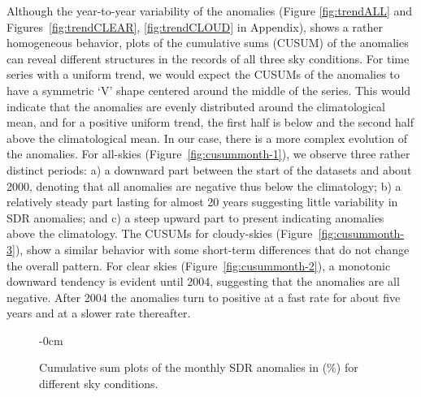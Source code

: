 \documentclass[applsci,article,submit,moreauthors,pdftex]{Definitions/mdpi}
\begin{document}
Although the year-to-year variability of the anomalies (Figure
\ref{fig:trendALL} and Figures~\ref{fig:trendCLEAR},
\ref{fig:trendCLOUD} in Appendix), shows a rather homogeneous behavior,
plots of the cumulative sums (CUSUM) \citep{Regier2019} of the anomalies
can reveal different structures in the records of all three sky
conditions. For time series with a uniform trend, we would expect the
CUSUMs of the anomalies to have a symmetric `V' shape centered around
the middle of the series. This would indicate that the anomalies are
evenly distributed around the climatological mean, and for a positive
uniform trend, the first half is below and the second half above the
climatological mean. In our case, there is a more complex evolution of
the anomalies. For all-skies (Figure~\ref{fig:cusummonth-1}), we observe
three rather distinct periods: a) a downward part between the start of
the datasets and about 2000, denoting that all anomalies are negative
thus below the climatology; b) a relatively steady part lasting for
almost 20 years suggesting little variability in SDR anomalies; and c) a
steep upward part to present indicating anomalies above the climatology.
The CUSUMs for cloudy-skies (Figure~\ref{fig:cusummonth-3}), show a
similar behavior with some short-term differences that do not change the
overall pattern. For clear skies (Figure~\ref{fig:cusummonth-2}), a
monotonic downward tendency is evident until 2004, suggesting that the
anomalies are all negative. After 2004 the anomalies turn to positive at
a fast rate for about five years and at a slower rate thereafter.

\begin{figure}[h!]
    \begin{adjustwidth}{-\extralength}{0cm}
        {\centering 
        \hfill
        \hfill
        \hfill
        }
\caption{Cumulative sum plots of the monthly SDR anomalies in (\%) for different sky conditions.}\label{fig:cusummonth}
\end{adjustwidth}
\end{figure}
\end{document}
